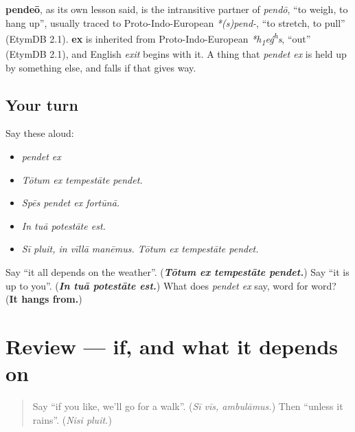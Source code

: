 \begin{cousinweb}
\textbf{pendeō}, as its own lesson said, is the intransitive partner of \emph{pendō}, \textquotedblleft{}to weigh, to hang up\textquotedblright{}, usually traced to Proto-Indo-European \emph{*(s)pend-}, \textquotedblleft{}to stretch, to pull\textquotedblright{} (EtymDB 2.1). \textbf{ex} is inherited from Proto-Indo-European \emph{*h\textsubscript{1}eǵ\textsuperscript{h}s}, \textquotedblleft{}out\textquotedblright{} (EtymDB 2.1), and English \emph{exit} begins with it. A thing that \emph{pendet ex} is held up by something else, and falls if that gives way.
\end{cousinweb}

\subsection*{Your turn}
Say these aloud:

\begin{itemize}
\raggedright
  \item \emph{pendet ex}
  \item \emph{Tōtum ex tempestāte pendet.}
  \item \emph{Spēs pendet ex fortūnā.}
  \item \emph{In tuā potestāte est.}
  \item \emph{Sī pluit, in vīllā manēmus. Tōtum ex tempestāte pendet.}
\end{itemize}

\begin{tcolorbox}[breakable,colback=teal!4,colframe=teal!35!black,title={Before you move on}]
Say \textquotedblleft{}it all depends on the weather\textquotedblright{}. (\emph{\textbf{Tōtum ex tempestāte pendet.}}) Say \textquotedblleft{}it is up to you\textquotedblright{}. (\emph{\textbf{In tuā potestāte est.}}) What does \emph{pendet ex} say, word for word? (\textbf{It hangs from.})
\end{tcolorbox}
\section[(review)]{Review — if, and what it depends on}

\label{lesson:LA-R289-if}



\begin{quote}
Say \textquotedblleft{}if you like, we'll go for a walk\textquotedblright{}. (\emph{Sī vīs, ambulāmus.}) Then \textquotedblleft{}unless it rains\textquotedblright{}. (\emph{Nisi pluit.})
\end{quote}

